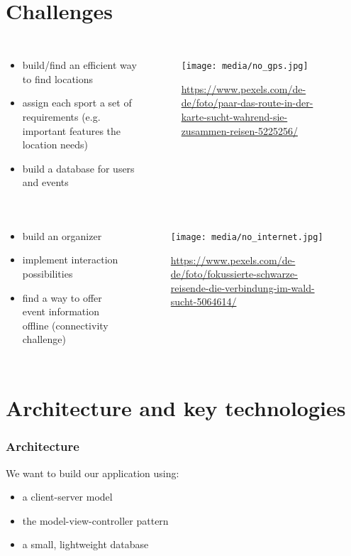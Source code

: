 \documentclass[aspectratio=169]{beamer}
\begin{document}
\section{Challenges}
\begin{frame}
\begin{columns}
	\begin{itemize}
		\item build/find an efficient way to find locations
		\item assign each sport a set of requirements (e.g. important features the location needs)
		\item build a database for users and events
	\end{itemize}
	 \begin{figure}
		 \centering
		\texttt{[image: media/no\_gps.jpg]}
		\caption{\url{https://www.pexels.com/de-de/foto/paar-das-route-in-der-karte-sucht-wahrend-sie-zusammen-reisen-5225256/}}
	\end{figure}
\end{columns}
\end{frame}

\begin{frame}
\begin{columns}
	\begin{itemize}
		\item build an organizer 
		\item implement interaction possibilities
		\item find a way to offer event information offline (connectivity challenge)
	\end{itemize}
	 \begin{figure}
	 \centering
	\texttt{[image: media/no\_internet.jpg]}
	\caption{\url{https://www.pexels.com/de-de/foto/fokussierte-schwarze-reisende-die-verbindung-im-wald-sucht-5064614/}}
\end{figure}
\end{columns}
\end{frame}




\section{Architecture and key technologies}
\begin{frame}
\frametitle{Architecture}
We want to build our application using:
	\begin{itemize}
		\item a client-server model 
		\item the model-view-controller pattern
		\item a small, lightweight database
	\end{itemize}
\end{frame}
\end{document}
